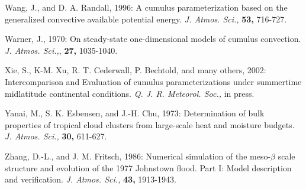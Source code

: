\por
Wang, J., and D. A. Randall, 1996: A cumulus parameterization based on
the generalized convective available potential energy.
{\it J. Atmos. Sci.,} {\bf 53,} 716-727.

\por
Warner, J., 1970: On steady-state one-dimensional models of
cumulus convection. {\it J. Atmos. Sci.,}, {\bf 27,} 1035-1040.


\por
Xie, S., K-M. Xu, R. T. Cederwall, P. Bechtold, and many others, 2002:
Intercomparison and Evaluation of cumulus parameterizations under summertime midlatitude
continental conditions. {\it Q. J. R. Meteorol. Soc.,} in press.

\por
Yanai, M., S. K. Esbensen, and J.-H. Chu, 1973: Determination of
bulk properties of tropical cloud clusters from large-scale heat and moisture
budgets. {\it J. Atmos. Sci.,} {\bf 30,} 611-627.

\por
Zhang, D.-L., and J. M. Fritsch, 1986: Numerical simulation of the
meso-$\beta$ scale structure and evolution of the 1977 Johnstown flood.
Part I: Model description and verification. {\it J. Atmos. Sci.,}
{\bf 43,} 1913-1943.

%




%
